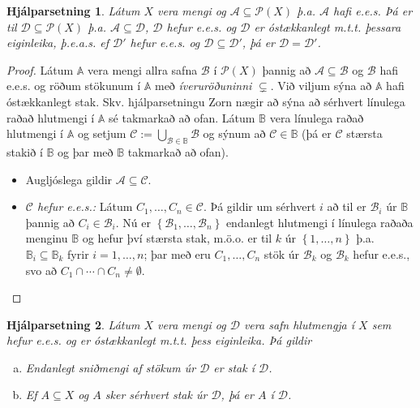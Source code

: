 \documentclass[a4paper,icelandic]{book}
\theoremstyle{definition}
\theoremstyle{plain}
\newtheorem{hjalparsetn}{Hjálparsetning}[section]
\theoremstyle{remark}
\begin{document}
\begin{hjalparsetn}
  \label{hjalp:tych_1}
  Látum $X$ vera mengi og $\mathcal A\subseteq\mathcal P(X)$ þ.a.
  $\mathcal A$ hafi e.e.s.  Þá er til $\mathcal D\subseteq\mathcal P(X)$
  þ.a. $\mathcal A\subseteq \mathcal D$, $\mathcal D$ hefur e.e.s. og
  $\mathcal D$ er óstækkanlegt m.t.t. þessara eiginleika, þ.e.a.s. ef
  $\mathcal D'$ hefur e.e.s. og $\mathcal D\subseteq \mathcal D'$, þá er
  $\mathcal D =\mathcal D'$.
\end{hjalparsetn}
\begin{proof}
  Látum $\mathbb A$ vera mengi allra safna $\mathcal B$ í $\mathcal
  P(X)$ þannig að $\mathcal A\subseteq \mathcal B$ og $\mathcal B$ hafi
  e.e.s. og röðum stökunum í $\mathbb A$ með
  \emph{íveruröðuninni} $\subsetneq$.
  Við viljum sýna að $\mathbb A$ hafi óstækkanlegt stak. Skv.
  hjálparsetningu Zorn nægir að sýna að sérhvert línulega raðað
  hlutmengi í $\mathbb A$ sé takmarkað að ofan. Látum $\mathbb B$ vera
  línulega raðað hlutmengi í $\mathbb A$ og setjum $\mathcal
  C:=\bigcup_{\mathcal B\in\mathbb B} \mathcal B$ og sýnum að $\mathcal
  C\in\mathbb B$ (þá er $\mathcal C$ stærsta stakið í $\mathbb B$ og þar
  með $\mathbb B$ takmarkað að ofan).
  \begin{itemize}
    \item Augljóslega gildir $\mathcal A\subseteq \mathcal C$. 
    \item \emph{$\mathcal C$ hefur e.e.s.:} Látum
      $C_1,\dots,C_n\in\mathcal C$. Þá gildir um sérhvert $i$ að til er
      $\mathcal B_i$ úr $\mathbb B$ þannig að $C_i\in\mathcal B_i$. Nú
      er $\left\{ \mathcal B_1,\dots,\mathcal B_n \right\}$ endanlegt
      hlutmengi í línulega raðaða menginu $\mathbb B$ og hefur því
      stærsta stak, m.ö.o. er til $k$ úr $\left\{ 1,\dots,n \right\}$
      þ.a. $\mathbb B_i\subseteq \mathbb B_k$ fyrir $i=1,\dots,n$; þar
      með eru $C_1,\dots,C_n$ stök úr $\mathcal B_k$ og $\mathcal B_k$
      hefur e.e.s., svo að $C_1\cap\cdots\cap C_n\neq\emptyset$.
  \end{itemize}
\end{proof}
\begin{hjalparsetn}
  \label{hjalp:tych_2}
  Látum $X$ vera mengi og $\mathcal D$ vera safn hlutmengja í $X$ sem
  hefur e.e.s. og er óstækkanlegt m.t.t. þess eiginleika. Þá gildir
  \begin{enumerate}[(a)]
    \item Endanlegt sniðmengi af stökum úr $\mathcal D$ er stak í
      $\mathcal D$. 
    \item Ef $A\subseteq X$ og $A$ sker sérhvert stak úr $\mathcal D$,
      þá er $A$ í $\mathcal D$.  
  \end{enumerate}
\end{hjalparsetn}
\end{document}
